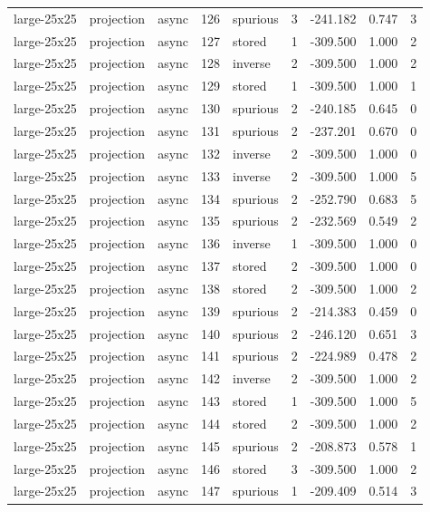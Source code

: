 \begin{tabular}{lllrlrrrr}
large-25x25 & projection & async & 126 & spurious & 3 & -241.182 & 0.747 & 3 \\
large-25x25 & projection & async & 127 & stored & 1 & -309.500 & 1.000 & 2 \\
large-25x25 & projection & async & 128 & inverse & 2 & -309.500 & 1.000 & 2 \\
large-25x25 & projection & async & 129 & stored & 1 & -309.500 & 1.000 & 1 \\
large-25x25 & projection & async & 130 & spurious & 2 & -240.185 & 0.645 & 0 \\
large-25x25 & projection & async & 131 & spurious & 2 & -237.201 & 0.670 & 0 \\
large-25x25 & projection & async & 132 & inverse & 2 & -309.500 & 1.000 & 0 \\
large-25x25 & projection & async & 133 & inverse & 2 & -309.500 & 1.000 & 5 \\
large-25x25 & projection & async & 134 & spurious & 2 & -252.790 & 0.683 & 5 \\
large-25x25 & projection & async & 135 & spurious & 2 & -232.569 & 0.549 & 2 \\
large-25x25 & projection & async & 136 & inverse & 1 & -309.500 & 1.000 & 0 \\
large-25x25 & projection & async & 137 & stored & 2 & -309.500 & 1.000 & 0 \\
large-25x25 & projection & async & 138 & stored & 2 & -309.500 & 1.000 & 2 \\
large-25x25 & projection & async & 139 & spurious & 2 & -214.383 & 0.459 & 0 \\
large-25x25 & projection & async & 140 & spurious & 2 & -246.120 & 0.651 & 3 \\
large-25x25 & projection & async & 141 & spurious & 2 & -224.989 & 0.478 & 2 \\
large-25x25 & projection & async & 142 & inverse & 2 & -309.500 & 1.000 & 2 \\
large-25x25 & projection & async & 143 & stored & 1 & -309.500 & 1.000 & 5 \\
large-25x25 & projection & async & 144 & stored & 2 & -309.500 & 1.000 & 2 \\
large-25x25 & projection & async & 145 & spurious & 2 & -208.873 & 0.578 & 1 \\
large-25x25 & projection & async & 146 & stored & 3 & -309.500 & 1.000 & 2 \\
large-25x25 & projection & async & 147 & spurious & 1 & -209.409 & 0.514 & 3 \\

\end{tabular}
